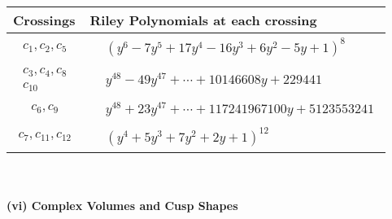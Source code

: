 \documentclass[1p]{elsarticle_modified}
\theoremstyle{definition}
\begin{document}
\begin{tabular}{m{50pt}|m{274pt}}
Crossings & \hspace{64pt}Riley Polynomials at each crossing \\
\hline $$\begin{aligned}c_{1},c_{2},c_{5}\end{aligned}$$&$\begin{aligned}
&(y^6-7 y^5+17 y^4-16 y^3+6 y^2-5 y+1)^8
\end{aligned}$\\
\hline $$\begin{aligned}c_{3},c_{4},c_{8}\\c_{10}\end{aligned}$$&$\begin{aligned}
&y^{48}-49 y^{47}+\cdots+10146608 y+229441
\end{aligned}$\\
\hline $$\begin{aligned}c_{6},c_{9}\end{aligned}$$&$\begin{aligned}
&y^{48}+23 y^{47}+\cdots+117241967100 y+5123553241
\end{aligned}$\\
\hline $$\begin{aligned}c_{7},c_{11},c_{12}\end{aligned}$$&$\begin{aligned}
&(y^4+5 y^3+7 y^2+2 y+1)^{12}
\end{aligned}$\\
\hline
\end{tabular}\\~\\
\newpage\flushleft \textbf{(vi) Complex Volumes and Cusp Shapes}
\end{document}
